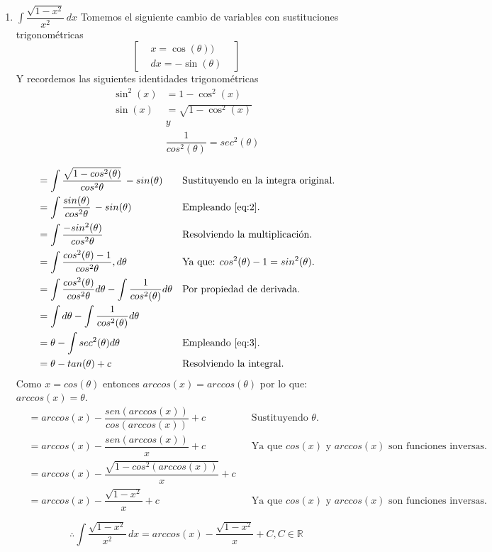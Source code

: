 \documentclass[letterpaper]{article}
\newcommand{\R}{\mathds{R}}
\renewcommand{\*}{\cdot}
\theoremstyle{definition}
\begin{document}
\begin{enumerate}
\begin{enumerate}
\item$\displaystyle \int \dfrac{\sqrt{1 - x^2}}{x^2} \, dx$
  Tomemos el siguiente cambio de variables con sustituciones trigonométricas
\[  \begin{bmatrix}
& x = \cos(\theta)) &\\
&dx = -\sin(\theta)&
\end{bmatrix} \]
Y recordemos las siguientes identidades trigonométricas
\begin{align*}
\sin^2(x) &= 1 - \cos^2(x) \tag{$\alpha$}\label{eq:1} \\ 
\sin(x) &= \sqrt{1 - \cos^2(x)} \tag{$\theta$}\label{eq:2} \\ 
& y \\
& \dfrac{1}{cos^2({\theta})} = {sec^2({\theta})} \tag{$\beta$}\label{eq:3} \\
\end{align*}
\begin{align*}
&= \int \dfrac{\sqrt{1 - cos^2{(\theta)}}}{cos^2{\theta}} \,-sin({\theta}) &&\text{Sustituyendo en la integra original.}\\
&= \int \dfrac{sin({\theta})}{cos^2{\theta}} \,-sin({\theta}) &&\text{Empleando \ref{eq:2}.}\\
&= \int \dfrac{-sin^2({\theta})}{cos^2{\theta}} &&\text{Resolviendo la multiplicación.}\\
&= \int \dfrac{cos^2({\theta})-1}{cos^2{\theta}}, d\theta &&\text{Ya que: $cos^2({\theta})-1 = sin^2({\theta})$.}\\
&= \int \dfrac{cos^2({\theta})}{cos^2{\theta}} d\theta - \int \dfrac{1}{cos^2({\theta})} d\theta &&\text{Por propiedad de derivada.}\\
&= \int d\theta - \int \dfrac{1}{cos^2({\theta})} d\theta\\
&= \theta - \int {sec^2({\theta})} d\theta &&\text{Empleando \ref{eq:3}.}\\
&= \theta - tan({\theta}) + c &&\text{Resolviendo la integral.}\\
\end{align*}
Como $ x = cos({\theta}) $ entonces $ arccos(x) = arccos({\theta})$ por lo que: $arccos(x) = \theta$. \\
\begin{align*}
&= arccos(x) - \dfrac{sen(arccos(x))}{cos(arccos(x))} + c &&\text{Sustituyendo $\theta$.}\\
&= arccos(x) - \dfrac{sen(arccos(x))}{x} + c &&\text{Ya que $cos(x)$ y $arccos(x)$ son funciones inversas.}\\
&= arccos(x) - \dfrac{{\sqrt{1 - cos^2(arccos(x))}}}{x} + c\\
&= arccos(x) - \dfrac{{\sqrt{1 - x^2}}}{x} + c &&\text{Ya que $cos(x)$ y $arccos(x)$ son funciones inversas.}\\\\
\end{align*}
\[ \therefore \int \dfrac{\sqrt{1 - x^2}}{x^2} \, dx = arccos(x) - \dfrac{{\sqrt{1 - x^2}}}{x} + C, C \in \R \]



\end{enumerate}
\end{enumerate}
\end{document}
